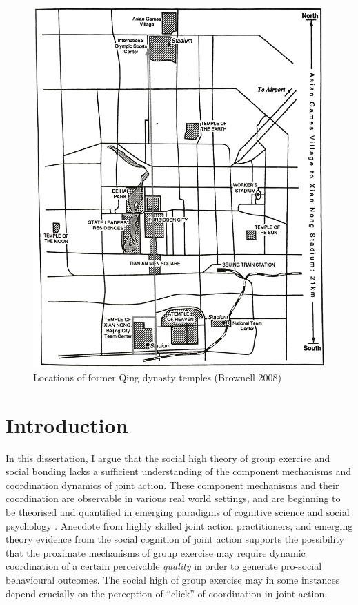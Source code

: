 \begin{CJK}{UTF8}{gbsn}
\begin{figure}[htbp]
  \includegraphics[width = \linewidth]{images/beijingTemplesXNT.png}
  \caption{Locations of former Qing dynasty temples (Brownell 2008)}
  \label{fig:beijingTemplesXNT}
\end{figure}




\section{Introduction}
In this dissertation, I argue that the social high theory of group exercise and social bonding lacks a sufficient understanding of the component mechanisms and coordination dynamics of joint action.  These component mechanisms and their coordination are observable in various real world settings, and are beginning to be theorised and quantified in emerging paradigms of cognitive science and social psychology \citep{Marsh2009}.  Anecdote from highly skilled joint action practitioners, and emerging theory evidence from the social cognition of joint action supports the possibility that the proximate mechanisms of group exercise may require dynamic coordination of a certain perceivable \textit{quality} in order to generate pro-social behavioural outcomes.  The social high of group exercise may in some instances depend crucially on the perception of ``click'' of coordination in joint action.


\end{CJK}
